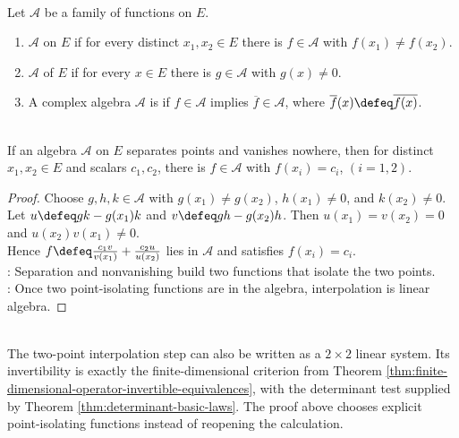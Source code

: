 \begin{definition} \label{def:separates-points-vanishes-nowhere-self-adjoint} \\
Let $\mathcal{A}$ be a family of functions on $E$.
\begin{enumerate}[label=(\roman*)]
\setlength{\itemsep}{0pt}
\item $\mathcal{A}$  on $E$ if for every distinct $x_1,x_2\in E$ there is $f\in\mathcal{A}$ with $f(x_1)\neq f(x_2)$.
\item $\mathcal{A}$  of $E$ if for every $x\in E$ there is $g\in\mathcal{A}$ with $g(x)\neq0$.
\item A complex algebra $\mathcal{A}$ is  if $f\in\mathcal{A}$ implies $\overline{f}\in\mathcal{A}$, where $\overline{f}(x)\defeq\overline{f(x)}$.
\end{enumerate}
\end{definition}

\begin{theorem} \label{thm:two-point-interpolation-in-separating-algebra} \\
If an algebra $\mathcal{A}$ on $E$ separates points and vanishes nowhere, then for distinct $x_1,x_2\in E$ and scalars $c_1,c_2$, there is $f\in\mathcal{A}$ with $f(x_i)=c_i$, $(i=1,2)$.
\begin{proof}
Choose $g,h,k\in\mathcal{A}$ with $g(x_1)\neq g(x_2)$, $h(x_1)\neq0$, and $k(x_2)\neq0$.\\
Let $u\defeq gk-g(x_1)k$ and $v\defeq gh-g(x_2)h$. Then $u(x_1)=v(x_2)=0$ and $u(x_2)v(x_1)\neq0$.\\
Hence $f\defeq \frac{c_1v}{v(x_1)}+\frac{c_2u}{u(x_2)}$ lies in $\mathcal{A}$ and satisfies $f(x_i)=c_i$.\\
: Separation and nonvanishing build two functions that isolate the two points.\\
: Once two point-isolating functions are in the algebra, interpolation is linear algebra.
\end{proof}
\end{theorem}

\begin{perspective} \label{per:stone-weierstrass-interpolation-linear-algebra} \\
The two-point interpolation step can also be written as a $2\times2$ linear system. Its invertibility is exactly the finite-dimensional criterion from Theorem \ref{thm:finite-dimensional-operator-invertible-equivalences}, with the determinant test supplied by Theorem \ref{thm:determinant-basic-laws}. The proof above chooses explicit point-isolating functions instead of reopening the calculation.
\end{perspective}

